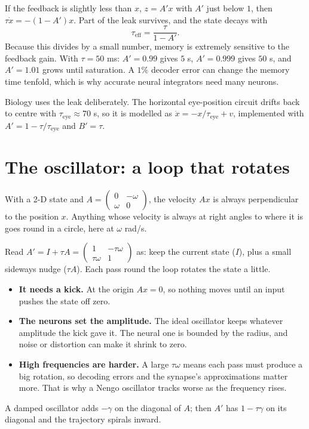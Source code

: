 \documentclass[11pt,letterpaper]{article}
\begin{document}
If the feedback is slightly less than $x$, $z = A'x$ with $A'$ just below $1$, then $\tau\dot x = -(1 - A')x$. Part of the leak survives, and the state decays with
\[
\tau_{\mathrm{eff}} = \frac{\tau}{1 - A'} .
\]
Because this divides by a small number, memory is extremely sensitive to the feedback gain. With $\tau = 50$ ms: $A' = 0.99$ gives $5$ s, $A' = 0.999$ gives $50$ s, and $A' = 1.01$ grows until saturation. A $1\%$ decoder error can change the memory time tenfold, which is why accurate neural integrators need many neurons.

Biology uses the leak deliberately. The horizontal eye-position circuit drifts back to centre with $\tau_{\mathrm{eye}} \approx 70$ s, so it is modelled as $\dot x = -x/\tau_{\mathrm{eye}} + v$, implemented with $A' = 1 - \tau/\tau_{\mathrm{eye}}$ and $B' = \tau$.

\section{The oscillator: a loop that rotates}

With a 2-D state and $A = \begin{pmatrix} 0 & -\omega \\ \omega & 0 \end{pmatrix}$, the velocity $Ax$ is always perpendicular to the position $x$. Anything whose velocity is always at right angles to where it is goes round in a circle, here at $\omega$ rad/s.

Read $A' = I + \tau A = \begin{pmatrix} 1 & -\tau\omega \\ \tau\omega & 1 \end{pmatrix}$ as: keep the current state ($I$), plus a small sideways nudge ($\tau A$). Each pass round the loop rotates the state a little.
\begin{itemize}
\item \textbf{It needs a kick.} At the origin $Ax = 0$, so nothing moves until an input pushes the state off zero.
\item \textbf{The neurons set the amplitude.} The ideal oscillator keeps whatever amplitude the kick gave it. The neural one is bounded by the radius, and noise or distortion can make it shrink to zero.
\item \textbf{High frequencies are harder.} A large $\tau\omega$ means each pass must produce a big rotation, so decoding errors and the synapse's approximations matter more. That is why a Nengo oscillator tracks worse as the frequency rises.
\end{itemize}
A damped oscillator adds $-\gamma$ on the diagonal of $A$; then $A'$ has $1 - \tau\gamma$ on its diagonal and the trajectory spirals inward.
\end{document}

